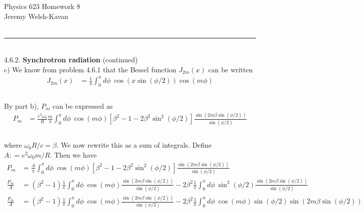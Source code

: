\documentclass[]{article}
\begin{document}
{\Large Physics 623 Homework 8}\\
{Jeremy Welsh-Kavan}\\
\hfill \\
\noindent\rule{15cm}{0.4pt} \\

4.6.2. {\bf Synchrotron radiation} (continued) \\



c)  We know from problem 4.6.1 that the Bessel function $J_{2m}(x)$ can be written \\

\begin{equation}
\begin{aligned}
J_{2m} (x)  & = \frac{1}{\pi} \int_{0}^{\pi} d\phi \: \cos( x \sin( \phi/2)) \cos(m \phi) \\
\end{aligned}
\end{equation} \\

By part b), $P_m$ can be expressed as \\

\begin{equation}
\begin{aligned}
P_m & = \frac{ e^2 \omega_0 }{ R} \frac{ m }{  \pi } \int_{0}^{\pi} d\phi \: \cos( m\phi )\left[ \beta^2 - 1 - 2 \beta^2 \sin^2( \phi/2 )  \right]   \frac{ \sin( 2m \beta \sin( \phi/2) )  }{ \sin( \phi/2)   } \\
\end{aligned} 
\end{equation} \\

where $\omega_0 R /c = \beta$. We now rewrite this as a sum of integrals. Define $A : = e^2 \omega_0 m /R$. Then we have \\

\begin{equation}
\begin{aligned}
P_m & = \frac{ A }{  \pi } \int_{0}^{\pi} d\phi \: \cos( m\phi ) \left[ \beta^2 - 1 - 2 \beta^2 \sin^2( \phi/2)  \right]   \frac{ \sin( 2m \beta \sin( \phi/2) )  }{ \sin( \phi/2 )  } \\
\frac{ P_m }{ A} & =  (\beta^2 - 1 ) \frac{ 1 }{  \pi } \int_{0}^{\pi} d\phi \: \cos( m\phi ) \frac{ \sin( 2m \beta \sin( \phi/2) )  }{ \sin( \phi/2 )  }  - 2 \beta^2   \frac{ 1 }{  \pi } \int_{0}^{\pi} d\phi \: \sin^2( \phi/2)     \frac{ \sin( 2m \beta \sin( \phi/2) )  }{ \sin( \phi/2 )  } \\
\frac{ P_m }{ A} & =  (\beta^2 - 1 ) \frac{ 1 }{  \pi } \int_{0}^{\pi} d\phi \: \cos( m\phi ) \frac{ \sin( 2m \beta \sin( \phi/2) )  }{ \sin( \phi/2 )  }  - 2 \beta^2   \frac{ 1 }{  \pi } \int_{0}^{\pi} d\phi \: \cos( m\phi )  \sin( \phi/2)   \sin( 2m \beta \sin( \phi/2) ) \\
\end{aligned} 
\end{equation} \\
\end{document}
